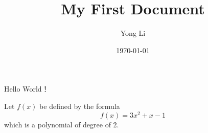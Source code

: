 \documentclass{article} %
\title{My First Document}
\author{Yong Li}
\date{\today}
\begin{document}
	\maketitle	%
	
	Hello World！
	
	Let $f(x)$ be defined by the formula$$f(x)=3x^2+x-1$$which is a polynomial of degree of 2.
\end{document}
